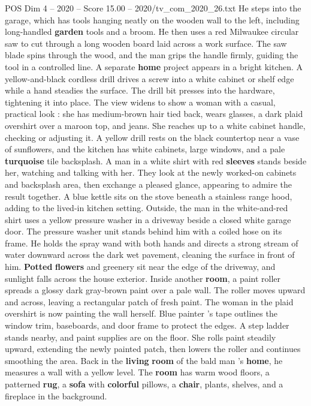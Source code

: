 \begin{textsample}{POS Dim 4 – 2020 – Score 15.00 – 2020/tv\_com\_2020\_26.txt}
He steps into the garage, which has tools hanging neatly on the wooden wall to the left, including long-handled \textbf{garden} tools and a broom.
He then uses a red Milwaukee circular saw to cut through a long wooden board laid across a work surface.
The saw blade spins through the wood, and the man grips the handle firmly, guiding the tool in a controlled line.
A separate \textbf{home} project appears in a bright kitchen.
A yellow-and-black cordless drill drives a screw into a white cabinet or shelf edge while a hand steadies the surface.
The drill bit presses into the hardware, tightening it into place.
The view widens to show a woman with a casual, practical look : she has medium-brown hair tied back, wears glasses, a dark plaid overshirt over a maroon top, and jeans.
She reaches up to a white cabinet handle, checking or adjusting it.
A yellow drill rests on the black countertop near a vase of sunflowers, and the kitchen has white cabinets, large windows, and a pale \textbf{turquoise} tile backsplash.
A man in a white shirt with red \textbf{sleeves} stands beside her, watching and talking with her.
They look at the newly worked-on cabinets and backsplash area, then exchange a pleased glance, appearing to admire the result together.
A blue kettle sits on the stove beneath a stainless range hood, adding to the lived-in kitchen setting.
Outside, the man in the white-and-red shirt uses a yellow pressure washer in a driveway beside a closed white garage door.
The pressure washer unit stands behind him with a coiled hose on its frame.
He holds the spray wand with both hands and directs a strong stream of water downward across the dark wet pavement, cleaning the surface in front of him. \textbf{Potted} \textbf{flowers} and greenery sit near the edge of the driveway, and sunlight falls across the house exterior.
Inside another \textbf{room}, a paint roller spreads a glossy dark gray-brown paint over a pale wall.
The roller moves upward and across, leaving a rectangular patch of fresh paint.
The woman in the plaid overshirt is now painting the wall herself.
Blue painter ’s tape outlines the window trim, baseboards, and door frame to protect the edges.
A step ladder stands nearby, and paint supplies are on the floor.
She rolls paint steadily upward, extending the newly painted patch, then lowers the roller and continues smoothing the area.
Back in the \textbf{living} \textbf{room} of the bald man ’s \textbf{home}, he measures a wall with a yellow level.
The \textbf{room} has warm wood floors, a patterned \textbf{rug}, a \textbf{sofa} with \textbf{colorful} pillows, a \textbf{chair}, plants, shelves, and a fireplace in the background.

\end{textsample}
